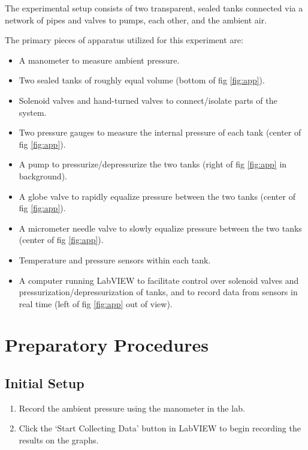 \documentclass[titlepage, twocolumn, 12pt]{article}
\begin{document}
The experimental setup consists of two transparent, sealed tanks connected via a network of pipes and valves to pumps, each other, and the ambient air.

The primary pieces of apparatus utilized for this experiment are:

\begin{itemize}
    \item A manometer to measure ambient pressure.
    \item Two sealed tanks of roughly equal volume (bottom of fig \ref{fig:app}).
    \item Solenoid valves and hand-turned valves to connect/isolate parts of the system.
    \item Two pressure gauges to measure the internal pressure of each tank (center of fig \ref{fig:app}).
    \item A pump to pressurize/depressurize the two tanks (right of fig \ref{fig:app} in background).
    \item A globe valve to rapidly equalize pressure between the two tanks (center of fig \ref{fig:app}).
    \item A micrometer needle valve to slowly equalize pressure between the two tanks (center of fig \ref{fig:app}).
    \item Temperature and pressure sensors within each tank.
    \item A computer running LabVIEW to facilitate control over solenoid valves and pressurization/depressurization of tanks, and to record data from sensors in real time (left of fig \ref{fig:app} out of view).
\end{itemize}

\section{Preparatory Procedures}

\subsection{Initial Setup}
\begin{enumerate}
    \item Record the ambient pressure using the manometer in the lab.
    \item Click the ‘Start Collecting Data’ button in LabVIEW to begin recording the results on the graphs.
\end{enumerate}
\end{document}
